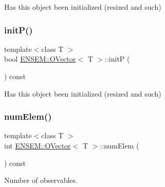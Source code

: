 Has this object been initialized (resized and such) 

\mbox{\label{classENSEM_1_1OVector_ae1c9e62826d9b61edc7f85d8f8aedf79}} 
\subsubsection{\texorpdfstring{initP()}{initP()}\hspace{0.1cm}{\footnotesize\ttfamily [3/3]}}
{\footnotesize\ttfamily template$<$class T $>$ \\
bool \mbox{\hyperlink{classENSEM_1_1OVector}{E\+N\+S\+E\+M\+::\+O\+Vector}}$<$ T $>$\+::initP (\begin{DoxyParamCaption}{ }\end{DoxyParamCaption}) const\hspace{0.3cm}{\ttfamily [inline]}}



Has this object been initialized (resized and such) 

\mbox{\label{classENSEM_1_1OVector_a77771968912766dab2f1bd6ed7ccc876}} 
\subsubsection{\texorpdfstring{numElem()}{numElem()}\hspace{0.1cm}{\footnotesize\ttfamily [1/3]}}
{\footnotesize\ttfamily template$<$class T $>$ \\
int \mbox{\hyperlink{classENSEM_1_1OVector}{E\+N\+S\+E\+M\+::\+O\+Vector}}$<$ T $>$\+::num\+Elem (\begin{DoxyParamCaption}{ }\end{DoxyParamCaption}) const\hspace{0.3cm}{\ttfamily [inline]}}



Number of observables. 

\mbox{\label{classENSEM_1_1OVector_a77771968912766dab2f1bd6ed7ccc876}} 
